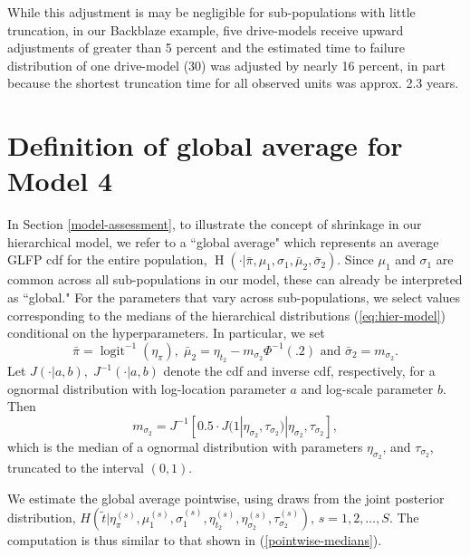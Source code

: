 \documentclass[12pt]{article}
\newcommand{\op}{\operatorname}
\begin{document}
While this adjustment is may be negligible for sub-populations with little truncation, in our Backblaze example, five drive-models receive upward adjustments of greater than 5 percent and the estimated time to failure distribution of one drive-model (30) was adjusted by nearly 16 percent, in part because the shortest truncation time for all observed units was approx. 2.3 years.

\section{Definition of global average for Model 4}
\label{global-avg}
In Section \ref{model-assessment}, to illustrate the concept of shrinkage in our hierarchical model, we refer to a ``global average" which represents an average GLFP cdf for the entire population, $\op{H}\left(\cdot|\bar{\pi},\mu_1,\sigma_1,\bar{\mu}_2,\bar{\sigma}_2\right)$. Since $\mu_1$ and $\sigma_1$ are common across all sub-populations in our model, these can already be interpreted as ``global." For the parameters that vary across sub-populations, we select values corresponding to the medians of the hierarchical distributions (\ref{eq:hier-model}) conditional on the hyperparameters. In particular, we set
$$\bar{\pi}=\op{logit}^{-1}(\eta_{\pi}),\;\bar{\mu}_2=\eta_{t_2} - m_{\sigma_2}\Phi^{-1}(.2) \mbox{ and } \bar{\sigma}_2= m_{\sigma_2}.$$
Let $J(\cdot|a,b),\;J^{-1}(\cdot|a,b)$ denote the cdf and inverse cdf, respectively, for a ognormal distribution with log-location parameter $a$ and log-scale parameter $b$. Then
$$m_{\sigma_2}=J^{-1}[0.5 \cdot J(1|\eta_{\sigma_2},\tau_{\sigma_2})|\eta_{\sigma_2}, \tau_{\sigma_2}],$$
which is the median of a ognormal distribution with parameters $\eta_{\sigma_2}$, and $\tau_{\sigma_2}$, truncated to the interval $(0, 1)$.

We estimate the global average pointwise, using draws from the joint posterior distribution, $H\left(\tilde{t}|\eta_\pi^{(s)}, \mu_1^{(s)}, \sigma_1^{(s)}, \eta_{t_2}^{(s)},\eta_{\sigma_2}^{(s)},\tau_{\sigma_2}^{(s)}\right)$, $s=1,2,\ldots,S$. The computation is thus similar to that shown in (\ref{pointwise-medians}).
\end{document}
